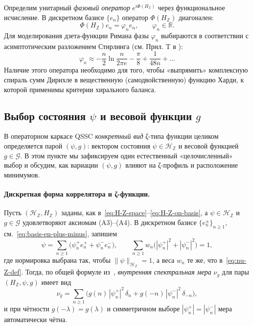 \documentclass{article}
\numberwithin{equation}{section}
\theoremstyle{plain}
\theoremstyle{definition}
\theoremstyle{remark}
\def\phi{φ}\def\Phi{Φ}\def\psi{ψ}\def\Psi{Ψ}%
\def\delta{δ}\def\Delta{Δ}\def\epsilon{ε}\def\zeta{ζ}%
\begin{document}
Определим унитарный \emph{фазовый оператор} $e^{i\Phi(H_{\mathbb Z})}$ через функциональное исчисление. В дискретном базисе $\{e_n\}$ оператор $\Phi(H_{\mathbb Z})$ диагонален:
\begin{equation}
\label{eq:Phi-def}
\Phi(H_{\mathbb Z}) e_n = \phi_n e_n, \qquad \phi_n \in \mathbb{R}.
\end{equation}
Для моделирования дзета-функции Римана фазы $\phi_n$ выбираются в соответствии с асимптотическим разложением Стирлинга (см. Прил. T в \cite{Monakhov-QSG-002}):
\begin{equation}
\phi_n \approx -\frac{n}{2}\ln\frac{n}{2\pi e} - \frac{\pi}{8} + \frac{1}{48n} + \dots
\end{equation}
Наличие этого оператора необходимо для того, чтобы «выпрямить» комплексную спираль сумм Дирихле в вещественную (самодвойственную) функцию Харди, к которой применимы критерии хирального баланса.

\subsection{Выбор состояния \texorpdfstring{$\psi$}{psi} и весовой функции \texorpdfstring{$g$}{g}}
\label{subsec:psi-g-choice}
\label{sec:correlator_measure}

\noindent
В операторном каркасе QSSC \emph{конкретный вид} ζ-типа функции целиком
определяется парой \((\psi,g)\): вектором состояния \(\psi\in\mathcal H_{\mathbb Z}\)
и весовой функцией \(g\in\mathcal G\). В этом пункте мы зафиксируем
один естественный «целочисленный» выбор и обсудим, как вариации \((\psi,g)\)
влияют на ζ-профиль и расположение минимумов.

\paragraph{Дискретная форма коррелятора и ζ-функции.}
Пусть \((\mathcal H_{\mathbb Z},H_{\mathbb Z})\) заданы, как
в~\eqref{eq:H-Z-space}–\eqref{eq:H-Z-on-basis}, а \(\psi\in\mathcal H_{\mathbb Z}\)
и \(g\in\mathcal G\) удовлетворяют аксиомам \textup{(A3)}–\textup{(A4)}.
В дискретном базисе \(\{e_n^\pm\}_{n\ge 1}\), см.~\eqref{eq:basis-en-plus-minus},
запишем
\begin{equation}
\label{eq:psi-expansion}
\psi
=
\sum_{n\ge 1}
\big(\psi_n^+ e_n^+ + \psi_n^- e_n^-\big),
\qquad
\sum_{n\ge 1} w_n\big(|\psi_n^+|^2+|\psi_n^-|^2\big) = 1,
\end{equation}
где нормировка выбрана так, чтобы \(\|\psi\|_{\mathcal H_{\mathbb Z}}=1\),
а веса \(w_n\) те же, что в~\eqref{eq:nu-Z-def}. Тогда, по общей формуле
из~\cite{Monakhov-QSG-002}, \emph{внутренняя спектральная мера}
\(\nu_g\) для пары \((H_{\mathbb Z},\psi,g)\) имеет вид
\begin{equation}
\label{eq:nu-g-discrete}
\nu_g
=
\sum_{n\ge 1}
\Big(
g(n)\,|\psi_n^+|^2\,\delta_n
+
g(-n)\,|\psi_n^-|^2\,\delta_{-n}
\Big),
\end{equation}
и при чётности \(g(-\lambda)=g(\lambda)\) и симметричном выборе
\(|\psi_n^+|=|\psi_n^-|\) мера автоматически чётна.
\end{document}
